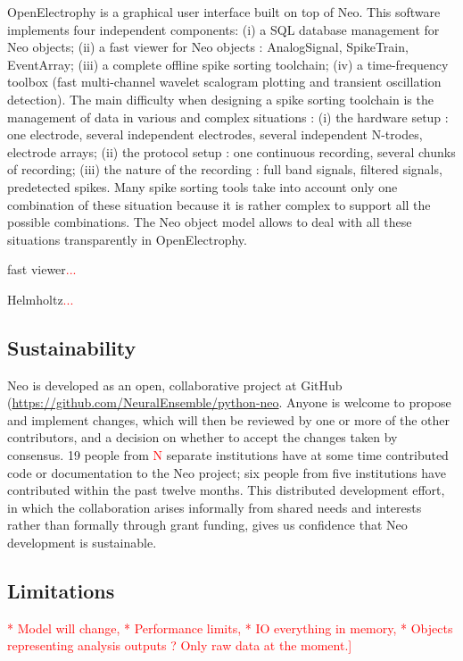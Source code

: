 \documentclass{frontiers}
\newcommand{\missing}[1]{\textcolor{red}{#1}}
\begin{document}
OpenElectrophy \citep{Garcia2009} is a graphical user interface built on top of Neo. This software implements four independent components:
   (i) a SQL database management for Neo objects;
   (ii) a fast viewer for Neo objects : AnalogSignal, SpikeTrain, EventArray;
   (iii) a complete offline spike sorting toolchain;
   (iv) a time-frequency toolbox (fast multi-channel wavelet scalogram plotting and transient oscillation detection).
The main difficulty when designing a spike sorting toolchain is the management of data in various and complex situations : 
   (i) the hardware setup : one electrode, several independent electrodes, several independent N-trodes, electrode arrays;
   (ii) the protocol setup : one continuous recording, several chunks of recording;
   (iii) the nature of the recording : full band signals, filtered signals, predetected spikes.
Many spike sorting tools take into account only one combination of these situation because it is rather complex to support all the possible combinations. The Neo object model allows to deal with all these situations transparently in OpenElectrophy.


fast viewer\missing{...}

Helmholtz\missing{...}


\subsection{Sustainability}

Neo is developed as an open, collaborative project at GitHub (\url{https://github.com/NeuralEnsemble/python-neo}.
Anyone is welcome to propose and implement changes, which will then be reviewed by one or more of the other contributors, and a decision on whether to accept the changes taken by consensus.
19 people from \missing{N} separate institutions have at some time contributed code or documentation to the Neo project;  six people from five institutions have contributed within the past twelve months.
This distributed development effort, in which the collaboration arises informally from shared needs and interests rather than formally through grant funding, gives us confidence that Neo development is sustainable.


\subsection{Limitations}
\missing{* Model will change, * Performance limits, * IO everything in memory, * Objects representing analysis outputs ? Only raw data at the moment.]}
\end{document}

